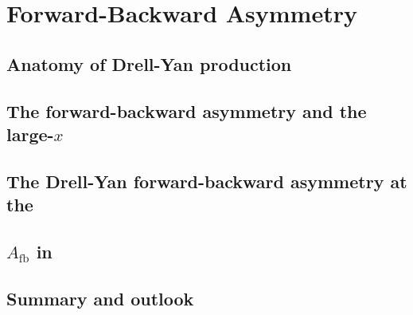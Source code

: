 
\chapter{Forward-Backward Asymmetry}
\label{ch:afb}
\minitoc
\adjustmtc




\section{Anatomy of Drell-Yan production}
\label{sec:afb/HMDY}


\section{The forward-backward asymmetry and the large-\texorpdfstring{$x$}{x} \pdfs}
\label{sec:afb/largexpdfs}


\section{The Drell-Yan forward-backward asymmetry at the \lhc}
\label{sec:afb/afb}


\section[AFB in NNPDF3.1]{\texorpdfstring{$A_\text{fb}$}{Afb} in }
\label{sec:afb/nnpdf31}


\section{Summary and outlook}
\label{sec:afb/summary}


